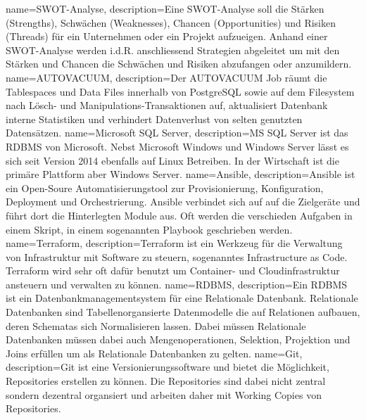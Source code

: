{
        name=SWOT-Analyse,
        description={Eine SWOT-Analyse soll die Stärken (Strengths), Schwächen (Weaknesses), Chancen (Opportunities) und Risiken (Threads) für ein Unternehmen oder ein Projekt aufzueigen.
Anhand einer SWOT-Analyse werden i.d.R. anschliessend Strategien abgeleitet um mit den Stärken und Chancen die Schwächen und Risiken abzufangen oder anzumildern.}
}
{
        name=AUTOVACUUM,
        description={Der AUTOVACUUM Job räumt die Tablespaces und Data Files innerhalb von PostgreSQL sowie auf dem Filesystem nach Lösch- und Manipulations-Transaktionen auf,
aktualisiert Datenbank interne Statistiken und verhindert Datenverlust von selten genutzten Datensätzen\cite{9EUWGEF8}.}
}
{
        name=Microsoft SQL Server,
        description={MS SQL Server ist das RDBMS von Microsoft\cite{6LRCXMLC}.
Nebst Microsoft Windows und Windows Server lässt es sich seit Version 2014 ebenfalls auf \Gls{Linux} Betreiben.
        In der Wirtschaft ist die primäre Plattform aber Windows Server.}
}
{
        name=Ansible,
        description={Ansible ist ein Open-Soure Automatisierungstool zur Provisionierung, Konfiguration, Deployment und Orchestrierung.
Ansible verbindet sich auf auf die Zielgeräte und führt dort die Hinterlegten Module aus. Oft werden die verschieden Aufgaben in einem Skript, in einem sogenannten Playbook geschrieben werden\cite{7SPK583Y}.}
}
{
        name=Terraform,
        description={Terraform ist ein Werkzeug für die Verwaltung von Infrastruktur mit Software zu steuern, sogenanntes Infrastructure as Code.
        Terraform wird sehr oft dafür benutzt um Container- und Cloudinfrastruktur ansteuern und verwalten zu können\cite{FMIBZY6N,U29WWCXR}.}
}
{
        name=RDBMS,
        description={Ein RDBMS ist ein Datenbankmanagementsystem für eine Relationale Datenbank.
        Relationale Datenbanken sind Tabellenorgansierte Datenmodelle die auf Relationen aufbauen, deren Schematas sich Normalisieren lassen.
        Dabei müssen Relationale Datenbanken müssen dabei auch Mengenoperationen, Selektion, Projektion und Joins erfüllen um als Relationale Datenbanken zu gelten\cite{Z9WAAQ2U}.}
}
{
        name=Git,
        description={Git ist eine Versionierungssoftware und bietet die Möglichkeit, Repositories erstellen zu können.
        Die Repositories sind dabei nicht zentral sondern dezentral organsiert und arbeiten daher mit Working Copies von Repositories\cite{33C32L9G, SCE846MP}.}
}
